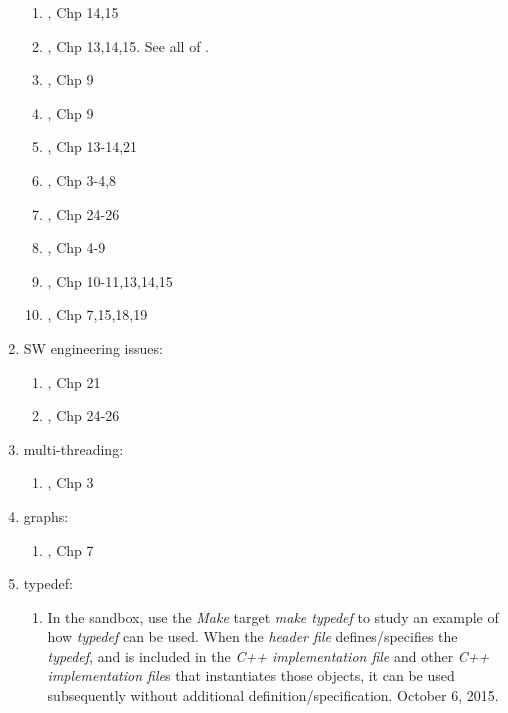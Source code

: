 \begin{enumerate}
	\begin{enumerate} \itemsep -2pt
	\item \cite{Eckel2000}, Chp 14,15
	\item \cite{Gaddis2010}, Chp 13,14,15. See all of \cite{Gaddis2010,Gaddis2011,Gaddis2012}.
	\item \cite{Stroustrup2014}, Chp 9
	\item \cite{Stroustrup2009}, Chp 9
	\item \cite{Oualline2003}, Chp 13-14,21
	\item \cite{Vermeir2001}, Chp 3-4,8
	\item \cite{Allain2012}, Chp 24-26
	\item \cite{Gregoire2014}, Chp 4-9
	\item \cite{Prata2012}, Chp 10-11,13,14,15
	\item \cite{Lippman2013}, Chp 7,15,18,19
	\end{enumerate}
\item SW engineering issues: \vspace{-0.3cm}
	\begin{enumerate} \itemsep -2pt
	\item \cite{Allain2012}, Chp 21
	\item \cite{Gregoire2014}, Chp 24-26
	\end{enumerate}
\item multi-threading: \vspace{-0.3cm}
	\begin{enumerate} \itemsep -2pt
	\item \cite{Schildt2004a}, Chp 3
	\end{enumerate}
\item graphs: \vspace{-0.3cm}
	\begin{enumerate} \itemsep -2pt
	\item \cite{Schildt2004a}, Chp 7
	\end{enumerate}
\item typedef: \vspace{-0.3cm}
	\begin{enumerate} \itemsep -2pt
	\item In the sandbox, use the {\it Make} target {\it make typedef} to study an example of how {\it typedef} can be used. When the {\it header file} defines/specifies the {\it typedef}, and is included in the {\it C++ implementation file} and other {\it C++ implementation file}s that instantiates those objects, it can be used subsequently without additional definition/specification. October 6, 2015.
	\end{enumerate}
\end{enumerate}


